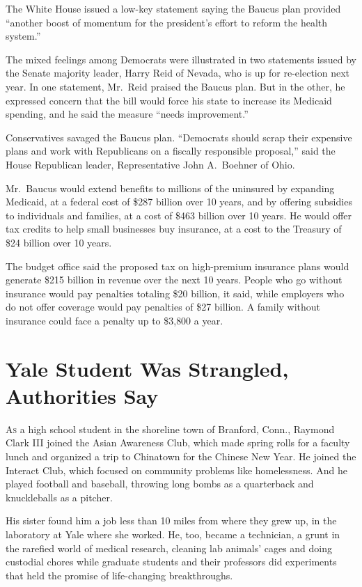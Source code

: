 ﻿\documentclass[12pt]{article}
\begin{document}
The White House issued a low-key statement saying the Baucus plan provided ``another boost of
momentum for the president's effort to reform the health system.''

The mixed feelings among Democrats were illustrated in two statements issued by the Senate majority
leader, Harry Reid of Nevada, who is up for re-election next year. In one statement, Mr.~Reid
praised the Baucus plan. But in the other, he expressed concern that the bill would force his state
to increase its Medicaid spending, and he said the measure ``needs improvement.''

Conservatives savaged the Baucus plan. ``Democrats should scrap their expensive plans and work with
Republicans on a fiscally responsible proposal,'' said the House Republican leader, Representative
John A.~Boehner of Ohio.

Mr.~Baucus would extend benefits to millions of the uninsured by expanding Medicaid, at a federal
cost of \$287 billion over 10 years, and by offering subsidies to individuals and families, at a
cost of \$463 billion over 10 years. He would offer tax credits to help small businesses buy
insurance, at a cost to the Treasury of \$24 billion over 10 years.

The budget office said the proposed tax on high-premium insurance plans would generate \$215 billion
in revenue over the next 10 years. People who go without insurance would pay penalties totaling \$20
billion, it said, while employers who do not offer coverage would pay penalties of \$27 billion. A
family without insurance could face a penalty up to \$3,800 a year.

\section{Yale Student Was Strangled, Authorities Say}

\lettrine{A}{s} a high school student in the shoreline town of Branford, Conn., Raymond Clark III
joined the Asian Awareness Club, which made spring rolls for a faculty lunch and organized a trip to
Chinatown for the Chinese New Year. He joined the Interact Club, which focused on community problems
like homelessness. And he played football and baseball, throwing long bombs as a quarterback and
knuckleballs as a pitcher.

His sister found him a job less than 10 miles from where they grew up, in the laboratory at Yale
where she worked. He, too, became a technician, a grunt in the rarefied world of medical research,
cleaning lab animals' cages and doing custodial chores while graduate students and their professors
did experiments that held the promise of life-changing breakthroughs.
\end{document}
